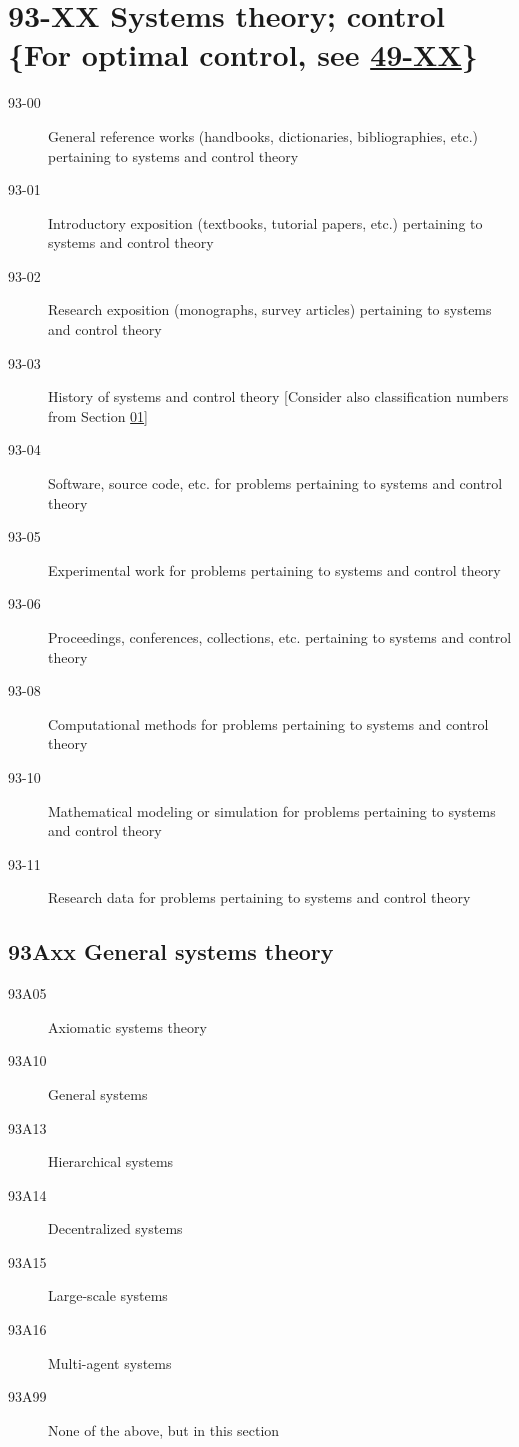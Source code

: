 \documentclass[letterpaper]{article}
\begin{document}
\section*{93-XX Systems theory; control \{For optimal control, see \hyperref[49-XX]{49-XX}\} }\label{93-XX}
\begin{description}
\item [93-00]\label{93-00} General reference works (handbooks, dictionaries, bibliographies, etc.) pertaining to systems and control theory
\item [93-01]\label{93-01}  Introductory exposition (textbooks, tutorial papers, etc.) pertaining to systems and control theory
\item [93-02]\label{93-02} Research exposition (monographs, survey articles) pertaining to systems and control theory
\item [93-03]\label{93-03} History of systems and control theory [Consider also classification numbers from Section \hyperref[01-XX]{01}]
\item [93-04]\label{93-04} Software, source code, etc. for problems pertaining to systems and control theory
\item [93-05]\label{93-05} Experimental work for problems pertaining to systems and control theory
\item [93-06]\label{93-06} Proceedings, conferences, collections, etc. pertaining to systems and control theory
\item [93-08]\label{93-08} Computational methods for problems pertaining to systems and control theory
\item [93-10]\label{93-10} Mathematical modeling or simulation for problems pertaining to systems and control theory
\item [93-11]\label{93-11} Research data for problems pertaining to systems and control theory
\end{description}
\subsection*{93Axx  General systems theory }\label{93Axx}
\begin{description}  
\item [93A05]\label{93A05} Axiomatic systems theory
\item [93A10]\label{93A10} General systems
\item [93A13]\label{93A13} Hierarchical systems
\item [93A14]\label{93A14} Decentralized systems
\item [93A15]\label{93A15} Large-scale systems
\item [93A16]\label{93A16} Multi-agent systems
\item [93A99]\label{93A99} None of the above, but in this section
\end{description}
\end{document}
